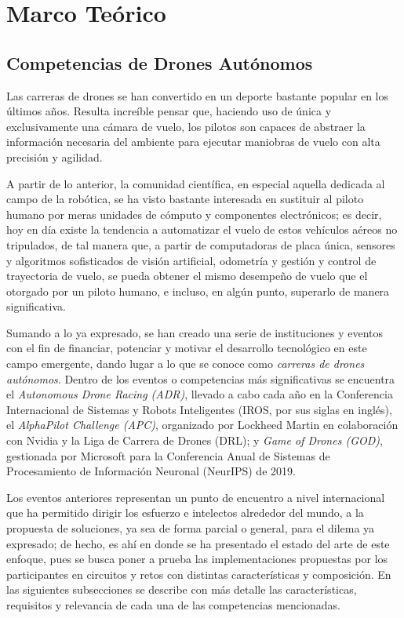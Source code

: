 \chapter{Marco Teórico}

\section{Competencias de Drones Autónomos}

Las carreras de drones se han convertido en un deporte bastante popular en los últimos años. Resulta increíble pensar que, haciendo uso de única y exclusivamente una cámara de vuelo, los pilotos son capaces de abstraer la información necesaria del ambiente para ejecutar maniobras de vuelo con alta precisión y agilidad. 

A partir de lo anterior, la comunidad científica, en especial aquella dedicada al campo de la robótica, se ha visto bastante interesada en sustituir al piloto humano por meras unidades de cómputo y componentes electrónicos; es decir, hoy en día existe la tendencia a automatizar el vuelo de estos vehículos aéreos no tripulados,  de tal manera que, a partir de computadoras de placa única, sensores y algoritmos sofisticados de visión artificial, odometría y gestión y control de trayectoria de vuelo, se pueda obtener el mismo desempeño de vuelo que el otorgado por un piloto humano, e incluso, en algún punto, superarlo de manera significativa.

Sumando a lo ya expresado, se han creado una serie de instituciones y eventos con el fin de financiar, potenciar y motivar el desarrollo tecnológico en este campo emergente, dando lugar a lo que se conoce como \textit{carreras de drones autónomos}. Dentro de los eventos o competencias más significativas se encuentra el \textit{Autonomous Drone Racing (ADR)}\cite{moon2017iros}, llevado a cabo cada año en la Conferencia Internacional de Sistemas y Robots Inteligentes (IROS, por sus siglas en inglés),  el \textit{AlphaPilot Challenge (APC)}\cite{foehn2020alphapilot}, organizado por Lockheed Martin en colaboración con Nvidia y la Liga de Carrera de Drones (DRL); y \textit{Game of Drones (GOD)}\cite{madaan2020airsim}, gestionada por Microsoft para la Conferencia Anual de Sistemas de Procesamiento de Información Neuronal (NeurIPS) de 2019.

Los eventos anteriores representan un punto de encuentro a nivel internacional que ha permitido dirigir los esfuerzo e intelectos alrededor del mundo, a la propuesta de soluciones, ya sea de forma parcial o general, para el dilema ya expresado; de hecho, es ahí en donde se ha presentado el estado del arte de este enfoque, pues se busca poner a prueba las implementaciones propuestas por los participantes en circuitos y retos con distintas características y composición. En las siguientes subsecciones se describe con más detalle las características, requisitos y relevancia de cada una de las competencias mencionadas.

